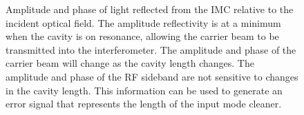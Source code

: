 \begin{figure}[h!]
\centering

\caption[Reflection at the IMC]{Amplitude and phase of light reflected from %
         the IMC relative to the incident optical field. The amplitude reflectivity %
         is at a minimum when the cavity is on resonance, allowing the carrier beam %
         to be transmitted into the interferometer. The amplitude and phase of the %
         carrier beam will change as the cavity length changes. The amplitude %
         and phase of the RF sideband are not sensitive to changes in the cavity %
         length. This information can be used to generate an error signal that %
         represents the length of the input mode cleaner.}
\label{fig:imc-reflection}
\end{figure}

